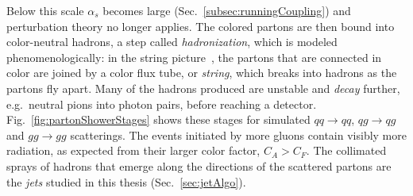 Below this scale \(\alpha_s\) becomes large (Sec.~\ref{subsec:runningCoupling}) and perturbation theory no longer applies.
%
The colored partons are then bound into color-neutral hadrons, a step called \emph{hadronization}, which is modeled phenomenologically: in the string picture~\cite{ANDERSSON198331}, the partons that are connected in color are joined by a color flux tube, or \emph{string}, which breaks into hadrons as the partons fly apart.
%
Many of the hadrons produced are unstable and \emph{decay} further, e.g.\ neutral pions into photon pairs, before reaching a detector.
%
Fig.~\ref{fig:partonShowerStages} shows these stages for simulated \(qq \to qq\), \(qg \to qg\) and \(gg \to gg\) scatterings.
%
The events initiated by more gluons contain visibly more radiation, as expected from their larger color factor, \(C_A > C_F\).
%
The collimated sprays of hadrons that emerge along the directions of the scattered partons are the \emph{jets} studied in this thesis (Sec.~\ref{sec:jetAlgo}).

